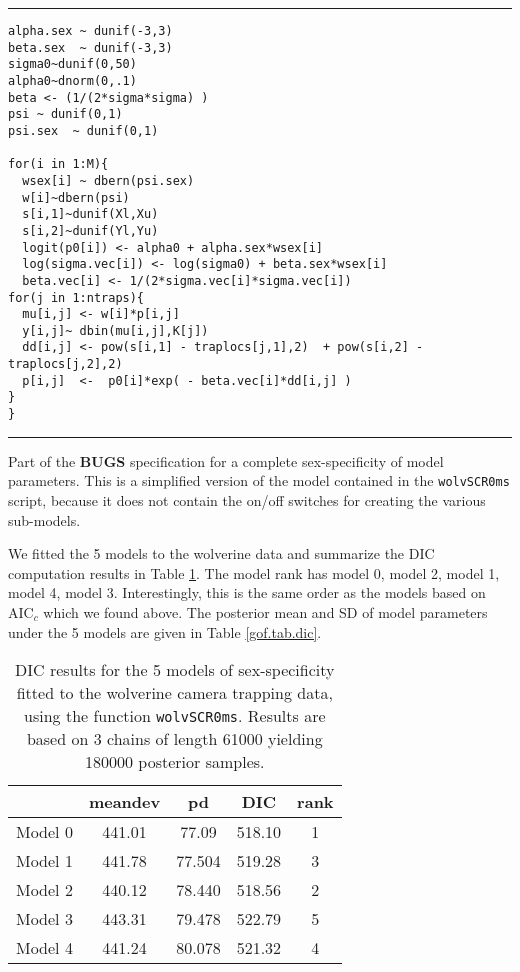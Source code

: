 \begin{panel}[htp]
\centering
\rule[0.15in]{\textwidth}{.03in}
{\small
\begin{verbatim}
alpha.sex ~ dunif(-3,3)
beta.sex  ~ dunif(-3,3)
sigma0~dunif(0,50)
alpha0~dnorm(0,.1)
beta <- (1/(2*sigma*sigma) )
psi ~ dunif(0,1)
psi.sex  ~ dunif(0,1)

for(i in 1:M){
  wsex[i] ~ dbern(psi.sex)
  w[i]~dbern(psi)
  s[i,1]~dunif(Xl,Xu)
  s[i,2]~dunif(Yl,Yu)
  logit(p0[i]) <- alpha0 + alpha.sex*wsex[i]
  log(sigma.vec[i]) <- log(sigma0) + beta.sex*wsex[i]
  beta.vec[i] <- 1/(2*sigma.vec[i]*sigma.vec[i])
for(j in 1:ntraps){
  mu[i,j] <- w[i]*p[i,j]
  y[i,j]~ dbin(mu[i,j],K[j])
  dd[i,j] <- pow(s[i,1] - traplocs[j,1],2)  + pow(s[i,2] - traplocs[j,2],2)
  p[i,j]  <-  p0[i]*exp( - beta.vec[i]*dd[i,j] )
}
}
\end{verbatim}
}
\rule[-0.15in]{\textwidth}{.03in}
\caption{
Part of the {\bf BUGS} specification for a complete sex-specificity of model
parameters. This is a simplified version of the model contained in the 
\mbox{\tt wolvSCR0ms} script, because it does not contain the on/off
switches for creating the various sub-models. 
}
\label{gof.panel.sexmodel}
\end{panel}


We fitted the 5 models to the wolverine data and summarize
the DIC computation results in Table \ref{gof.tab.DIC}. 
The model rank has model 0, model 2, model 1, model 4, model 3.
Interestingly, this is the same order as the models based on AIC$_c$
which we found above. 
The posterior mean and SD of model parameters under the 5 models are
given in Table \ref{gof.tab.dic}. 

\begin{table}
\centering
\caption{
DIC results for the 5 models of sex-specificity fitted to the
wolverine camera trapping data, using the function
\mbox{\tt wolvSCR0ms}. Results are based on 3 chains of length 61000
yielding 180000 posterior samples. 
}
\begin{tabular}{ccccc} \hline \hline
      &  meandev  &  pd   &    DIC  &   rank \\ \hline
Model 0&  441.01 & 77.09&518.10&    1 \\
Model 1& 441.78 &77.504 &519.28&    3\\
Model 2& 440.12 &78.440 &518.56&    2\\
Model 3& 443.31 &79.478 &522.79&    5\\
Model 4& 441.24 &80.078 &521.32&    4\\
\end{tabular}
\label{gof.tab.DIC}
\end{table}

